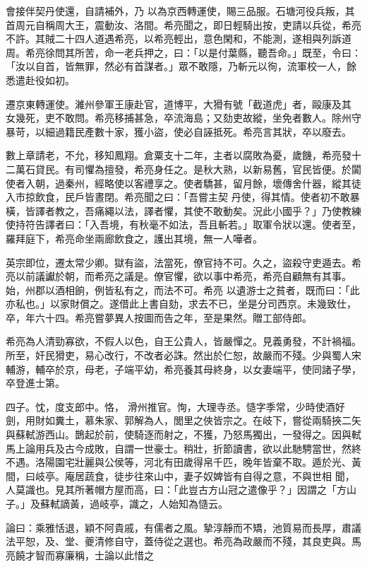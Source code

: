 \begin{pinyinscope}
 會接伴契丹使還，自請補外，乃
 以為京西轉運使，賜三品服。石塘河役兵叛，其首周元自稱周大王，震動汝、洛間。希亮聞之，即日輕騎出按，吏請以兵從，希亮不許。其賊二十四人道遇希亮，以希亮輕出，意色閑和，不能測，遂相與列訴道周。希亮徐問其所苦，命一老兵押之，曰：「以是付葉縣，聽吾命。」既至，令曰：「汝以自首，皆無罪，然必有首謀者。」眾不敢隱，乃斬元以徇，流軍校一人，餘悉遣赴役如初。



 遷京東轉運使。濰州參軍王康赴官，道博平，大猾有號「截道虎」者，毆康及其
 女幾死，吏不敢問。希亮移捕甚急，卒流海島；又劾吏故縱，坐免者數人。除州守暴苛，以細過籍民產數十家，獲小盜，使必自誣抵死。希亮言其狀，卒以廢去。



 數上章請老，不允，移知鳳翔。倉粟支十二年，主者以腐敗為憂，歲饑，希亮發十二萬石貸民。有司懼為擅發，希亮身任之。是秋大熟，以新易舊，官民皆便。於闐使者入朝，過秦州，經略使以客禮享之。使者驕甚，留月餘，壞傳舍什器，縱其徒入市掠飲食，民戶皆晝閉。希亮聞之曰：「吾嘗主契
 丹使，得其情。使者初不敢暴橫，皆譯者教之，吾痛繩以法，譯者懼，其使不敢動矣。況此小國乎？」乃使教練使持符告譯者曰：「入吾境，有秋毫不如法，吾且斬若。」取軍令狀以還。使者至，羅拜庭下，希亮命坐兩廊飲食之，護出其境，無一人嘩者。



 英宗即位，遷太常少卿。獄有盜，法當死，僚官持不可。久之，盜殺守吏遁去。希亮以前議讞於朝，而希亮之議是。僚官懼，欲以事中希亮，希亮自顧無有其事。始，州郡以酒相餉，例皆私有之，而法不可。希亮
 以遺游士之貧者，既而曰：「此亦私也。」以家財償之。遂借此上書自劾，求去不已，坐是分司西京。未幾致仕，卒，年六十四。希亮嘗夢異人按圖而告之年，至是果然。贈工部侍郎。



 希亮為人清勁寡欲，不假人以色，自王公貴人，皆嚴憚之。見義勇發，不計禍福。所至，奸民猾吏，易心改行，不改者必誅。然出於仁恕，故嚴而不殘。少與蜀人宋輔游，輔卒於京，母老，子端平幼，希亮養其母終身，以女妻端平，使同諸子學，卒登進士第。



 四子。忱，度支郎中。恪，
 滑州推官。恂，大理寺丞。慥字季常，少時使酒好劍，用財如糞土，慕朱家、郭解為人，閭里之俠皆宗之。在岐下，嘗從兩騎挾二矢與蘇軾游西山。鵲起於前，使騎逐而射之，不獲，乃怒馬獨出，一發得之。因與軾馬上論用兵及古今成敗，自謂一世豪士。稍壯，折節讀書，欲以此馳騁當世，然終不遇。洛陽園宅壯麗與公侯等，河北有田歲得帛千匹，晚年皆棄不取。遁於光、黃間，曰岐亭。庵居蔬食，徒步往來山中，妻子奴婢皆有自得之意，不與世相
 聞，人莫識也。見其所著帽方屋而高，曰：「此豈古方山冠之遣像乎？」因謂之「方山子。」及蘇軾謫黃，過岐亭，識之，人始知為慥云。



 論曰：乘雅恬退，穎不阿貴戚，有儒者之風。摯淳靜而不矯，池質易而長厚，肅議法平恕，及、堂、夔清修自守，蓋侍從之選也。希亮為政嚴而不殘，其良吏與。馬亮饒才智而寡廉稱，士論以此惜之



\end{pinyinscope}